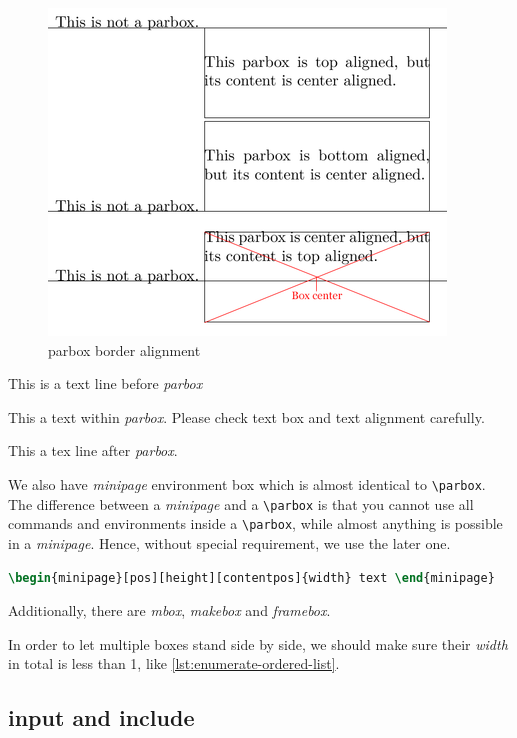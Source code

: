 \begin{figure}[!htb]
  \centering
  \includegraphics{parbox_border_alignment}
  \caption{parbox border alignment}
  \label{fig:parbox-border-alignment}
\end{figure}

This is a text line before \textit{parbox}
\parbox[t][2cm][b]{5cm}{This a text within \textit{parbox}. Please
  check text box and text alignment carefully.} This a tex line
after \textit{parbox}.

We also have \textit{minipage} environment box which is almost
identical to \verb|\parbox|. The difference between a
\textit{minipage} and a \verb|\parbox| is that you cannot use all
commands and environments inside a \verb|\parbox|, while almost
anything is possible in a \textit{minipage}. Hence, without
special requirement, we use the later one.

\begin{lstlisting}[language=TeX,caption={minipage box},label={lst:minipage-box}]
\begin{minipage}[pos][height][contentpos]{width} text \end{minipage}
\end{lstlisting}

Additionally, there are \textit{mbox}, \textit{makebox} and
\textit{framebox}.

In order to let multiple boxes stand side by side, we should make
sure their \textit{width} in total is less than 1, like
\ref{lst:enumerate-ordered-list}.

\subsection{input and include}
\label{sec:input-include}

